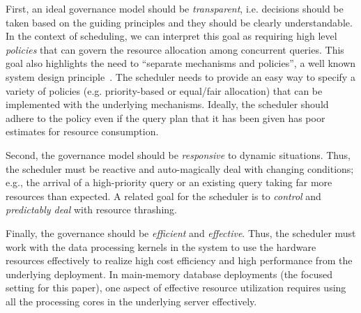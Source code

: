 First, an ideal governance model should be \textit{transparent}, i.e. decisions should be taken based on the guiding principles and they should be clearly understandable.
In the context of scheduling, we can interpret this goal as requiring high level \textit{policies} that can govern the resource allocation among concurrent queries. 
This goal also highlights the need to ``separate mechanisms and policies'', a well known system design principle~\cite{LampsonS76}.
The scheduler needs to provide an easy way to specify a variety of policies (e.g. priority-based or equal/fair allocation) that can be implemented with the underlying mechanisms.
Ideally, the scheduler should adhere to the policy even if the query plan that it has been given has poor estimates for resource consumption.

Second, the governance model should be \textit{responsive} to dynamic situations. 
Thus, the scheduler must be reactive and auto-magically deal with changing conditions; e.g., the arrival of a high-priority query or an existing query taking far more resources than expected. 
A related goal for the scheduler is to \textit{control} and \textit{predictably deal} with resource thrashing.

Finally, the governance should be \textit{efficient} and \textit{effective}. 
Thus, the scheduler must work with the data processing kernels in the system to use the hardware resources effectively to realize high cost efficiency and high performance from the underlying deployment. 
In main-memory database deployments (the focused setting for this paper), one aspect of effective resource utilization requires using all the processing cores in the underlying server effectively. 

